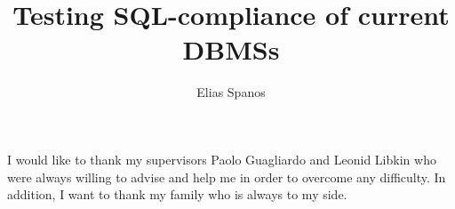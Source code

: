 \documentclass[msc, logo]{infthesis}  %
\title{ Testing SQL-compliance of current DBMSs}
\author{Elias Spanos}
\begin{document}
\begin{preliminary}

\maketitle

\begin{acknowledgements}
 
I would like to thank my supervisors Paolo Guagliardo and Leonid Libkin who were always willing to advise and help me in order to overcome any difficulty. In addition, I want to thank my family who is always to my side.

\end{acknowledgements}

\standarddeclaration


\tableofcontents




\end{preliminary}



 






% 

\appendix





 




\end{document}
